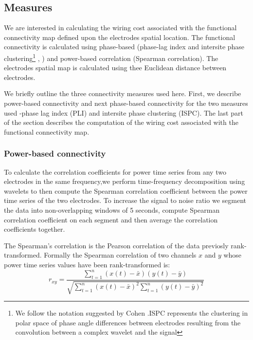 \documentclass[11pt, onecolumn]{article}
\begin{document}
\subsection{Measures}
We are interested in calculating the wiring cost associated with the functional connectivity map defined upon the electrodes spatial location. The functional connectivity is calculated using phase-based (phase-lag index \citep{stam2007phase} and intersite phase clustering\footnote{We follow the notation suggested by Cohen \citep{cohen2014analyzing}.ISPC  represents the clustering in polar space of phase angle differences between electrodes resulting from the convolution between a complex wavelet and the signal} \citep{lachaux1999measuring}, \citep{mormann2000mean}) and power-based correlation (Spearman correlation).
The electrodes spatial map is calculated using thee Euclidean distance between electrodes.

We briefly outline the three connectivity measures used here. First, we describe power-based connectivity and next phase-based connectivity for the two measures used -phase lag index (PLI) and intersite phase clustering (ISPC). The last part of the section describes the computation of the wiring cost associated with the functional connectivity map. 
\subsubsection{Power-based connectivity}
To calculate the correlation coefficients for power time series from any two electrodes in the same frequency,we perform time-frequency decomposition using wavelets to then compute the Spearman correlation coefficient between the power time series of the two electrodes. 
To increase the signal to noise ratio we segment the data into non-overlapping windows of 5 seconds, compute Spearman correlation coefficient on each segment and then average the correlation coefficients together. %

The Spearman's correlation is the Pearson correlation of the data previosly rank-transformed. Formally the Spearman correlation of two channels $x$ and $y$ whose power time series values have been rank-transformed is:
\begin{equation}
r_{xy} = \frac{\sum_{t=1}^{n}(x(t) - \bar{x})(y(t) - \bar{y})}{\sqrt{{\sum_{t=1}^{n}(x(t) - \bar{x})^2}{\sum_{t=1}^{n}(y(t) - \bar{y})^2}}}
\label{eq:pears}
\end{equation}
\end{document}

